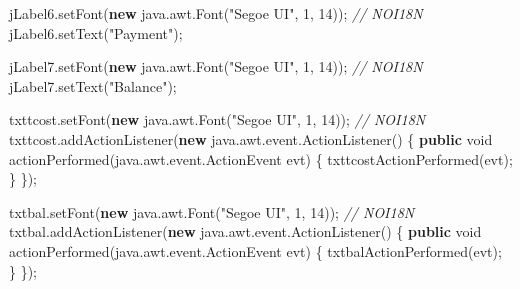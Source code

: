 \documentclass[
  10pt,
]{article}
\newenvironment{Shaded}{}{}
\newcommand{\CommentTok}[1]{\textcolor[rgb]{0.38,0.63,0.69}{\textit{#1}}}
\newcommand{\DataTypeTok}[1]{\textcolor[rgb]{0.56,0.13,0.00}{#1}}
\newcommand{\DecValTok}[1]{\textcolor[rgb]{0.25,0.63,0.44}{#1}}
\newcommand{\FunctionTok}[1]{\textcolor[rgb]{0.02,0.16,0.49}{#1}}
\newcommand{\KeywordTok}[1]{\textcolor[rgb]{0.00,0.44,0.13}{\textbf{#1}}}
\newcommand{\NormalTok}[1]{#1}
\newcommand{\OperatorTok}[1]{\textcolor[rgb]{0.40,0.40,0.40}{#1}}
\newcommand{\StringTok}[1]{\textcolor[rgb]{0.25,0.44,0.63}{#1}}
\begin{document}
\begin{Shaded}
\begin{Highlighting}[numbers=left,,]
\NormalTok{        jLabel6}\OperatorTok{.}\FunctionTok{setFont}\OperatorTok{(}\KeywordTok{new}\NormalTok{ java}\OperatorTok{.}\FunctionTok{awt}\OperatorTok{.}\FunctionTok{Font}\OperatorTok{(}\StringTok{"Segoe UI"}\OperatorTok{,} \DecValTok{1}\OperatorTok{,} \DecValTok{14}\OperatorTok{));} \CommentTok{// NOI18N}
\NormalTok{        jLabel6}\OperatorTok{.}\FunctionTok{setText}\OperatorTok{(}\StringTok{"Payment"}\OperatorTok{);}

\NormalTok{        jLabel7}\OperatorTok{.}\FunctionTok{setFont}\OperatorTok{(}\KeywordTok{new}\NormalTok{ java}\OperatorTok{.}\FunctionTok{awt}\OperatorTok{.}\FunctionTok{Font}\OperatorTok{(}\StringTok{"Segoe UI"}\OperatorTok{,} \DecValTok{1}\OperatorTok{,} \DecValTok{14}\OperatorTok{));} \CommentTok{// NOI18N}
\NormalTok{        jLabel7}\OperatorTok{.}\FunctionTok{setText}\OperatorTok{(}\StringTok{"Balance"}\OperatorTok{);}

\NormalTok{        txttcost}\OperatorTok{.}\FunctionTok{setFont}\OperatorTok{(}\KeywordTok{new}\NormalTok{ java}\OperatorTok{.}\FunctionTok{awt}\OperatorTok{.}\FunctionTok{Font}\OperatorTok{(}\StringTok{"Segoe UI"}\OperatorTok{,} \DecValTok{1}\OperatorTok{,} \DecValTok{14}\OperatorTok{));} \CommentTok{// NOI18N}
\NormalTok{        txttcost}\OperatorTok{.}\FunctionTok{addActionListener}\OperatorTok{(}\KeywordTok{new}\NormalTok{ java}\OperatorTok{.}\FunctionTok{awt}\OperatorTok{.}\FunctionTok{event}\OperatorTok{.}\FunctionTok{ActionListener}\OperatorTok{()} \OperatorTok{\{}
            \KeywordTok{public} \DataTypeTok{void} \FunctionTok{actionPerformed}\OperatorTok{(}\NormalTok{java}\OperatorTok{.}\FunctionTok{awt}\OperatorTok{.}\FunctionTok{event}\OperatorTok{.}\FunctionTok{ActionEvent}\NormalTok{ evt}\OperatorTok{)} \OperatorTok{\{}
                \FunctionTok{txttcostActionPerformed}\OperatorTok{(}\NormalTok{evt}\OperatorTok{);}
            \OperatorTok{\}}
        \OperatorTok{\});}

\NormalTok{        txtbal}\OperatorTok{.}\FunctionTok{setFont}\OperatorTok{(}\KeywordTok{new}\NormalTok{ java}\OperatorTok{.}\FunctionTok{awt}\OperatorTok{.}\FunctionTok{Font}\OperatorTok{(}\StringTok{"Segoe UI"}\OperatorTok{,} \DecValTok{1}\OperatorTok{,} \DecValTok{14}\OperatorTok{));} \CommentTok{// NOI18N}
\NormalTok{        txtbal}\OperatorTok{.}\FunctionTok{addActionListener}\OperatorTok{(}\KeywordTok{new}\NormalTok{ java}\OperatorTok{.}\FunctionTok{awt}\OperatorTok{.}\FunctionTok{event}\OperatorTok{.}\FunctionTok{ActionListener}\OperatorTok{()} \OperatorTok{\{}
            \KeywordTok{public} \DataTypeTok{void} \FunctionTok{actionPerformed}\OperatorTok{(}\NormalTok{java}\OperatorTok{.}\FunctionTok{awt}\OperatorTok{.}\FunctionTok{event}\OperatorTok{.}\FunctionTok{ActionEvent}\NormalTok{ evt}\OperatorTok{)} \OperatorTok{\{}
                \FunctionTok{txtbalActionPerformed}\OperatorTok{(}\NormalTok{evt}\OperatorTok{);}
            \OperatorTok{\}}
        \OperatorTok{\});}


\end{Highlighting}
\end{Shaded}
\end{document}
